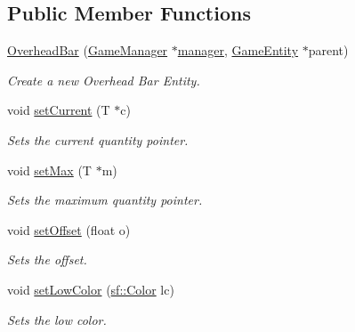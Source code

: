 \subsection*{Public Member Functions}
\begin{DoxyCompactItemize}
\item 
\mbox{\hyperlink{class_overhead_bar_a62b70c8c2a6638cc4114a7454266d288}{Overhead\+Bar}} (\mbox{\hyperlink{class_game_manager}{Game\+Manager}} $\ast$\mbox{\hyperlink{class_game_entity_a1771f6e83f237a25fe370dd3a926cfb1}{manager}}, \mbox{\hyperlink{class_game_entity}{Game\+Entity}} $\ast$parent)
\begin{DoxyCompactList}\small\item\em Create a new Overhead Bar Entity. \end{DoxyCompactList}\item 
void \mbox{\hyperlink{class_overhead_bar_aaa734d603dd0de5b0bbd5498ed1a306f}{set\+Current}} (T $\ast$c)
\begin{DoxyCompactList}\small\item\em Sets the current quantity pointer. \end{DoxyCompactList}\item 
void \mbox{\hyperlink{class_overhead_bar_a976c0bdb2b7a6d30c87aba6b2bdb18b9}{set\+Max}} (T $\ast$m)
\begin{DoxyCompactList}\small\item\em Sets the maximum quantity pointer. \end{DoxyCompactList}\item 
\mbox{\label{class_overhead_bar_a319827d8ed8690fe4cd785cbf5fed0dc}} 
void \mbox{\hyperlink{class_overhead_bar_a319827d8ed8690fe4cd785cbf5fed0dc}{set\+Offset}} (float o)
\begin{DoxyCompactList}\small\item\em Sets the offset. \end{DoxyCompactList}\item 
\mbox{\label{class_overhead_bar_abe8fa5fbe2864bc0f2c43ed64fba24c2}} 
void \mbox{\hyperlink{class_overhead_bar_abe8fa5fbe2864bc0f2c43ed64fba24c2}{set\+Low\+Color}} (\mbox{\hyperlink{classsf_1_1_color}{sf\+::\+Color}} lc)
\begin{DoxyCompactList}\small\item\em Sets the low color. \end{DoxyCompactList}\item 
\mbox{\label{class_overhead_bar_aed93064fe3cd93824551d45c6ca640e4}} 

\end{DoxyCompactItemize}
